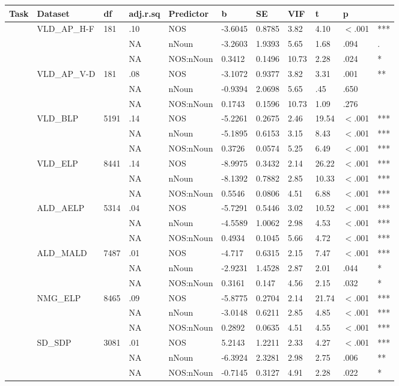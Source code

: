 \begin{table}[ht]
\centering
\begingroup\normalsize
\begin{tabular}{lllllllllll}
  \hline
Task & Dataset & df & adj.r.sq & Predictor & b & SE & VIF & t & p &  \\ 
  \hline
 & VLD\_AP\_H-F & 181 & .10 & NOS & -3.6045 & 0.8785 & 3.82 & 4.10 & $<$.001 & *** \\ 
   &  &  & NA & nNoun & -3.2603 & 1.9393 & 5.65 & 1.68 & .094 & . \\ 
   &  &  & NA & NOS:nNoun & 0.3412 & 0.1496 & 10.73 & 2.28 & .024 & * \\ 
   & VLD\_AP\_V-D & 181 & .08 & NOS & -3.1072 & 0.9377 & 3.82 & 3.31 & .001 & ** \\ 
   &  &  & NA & nNoun & -0.9394 & 2.0698 & 5.65 & .45 & .650 &   \\ 
   &  &  & NA & NOS:nNoun & 0.1743 & 0.1596 & 10.73 & 1.09 & .276 &   \\ 
   & VLD\_BLP & 5191 & .14 & NOS & -5.2261 & 0.2675 & 2.46 & 19.54 & $<$.001 & *** \\ 
   &  &  & NA & nNoun & -5.1895 & 0.6153 & 3.15 & 8.43 & $<$.001 & *** \\ 
   &  &  & NA & NOS:nNoun & 0.3726 & 0.0574 & 5.25 & 6.49 & $<$.001 & *** \\ 
   & VLD\_ELP & 8441 & .14 & NOS & -8.9975 & 0.3432 & 2.14 & 26.22 & $<$.001 & *** \\ 
   &  &  & NA & nNoun & -8.1392 & 0.7882 & 2.85 & 10.33 & $<$.001 & *** \\ 
   &  &  & NA & NOS:nNoun & 0.5546 & 0.0806 & 4.51 & 6.88 & $<$.001 & *** \\ 
   & ALD\_AELP & 5314 & .04 & NOS & -5.7291 & 0.5446 & 3.02 & 10.52 & $<$.001 & *** \\ 
   &  &  & NA & nNoun & -4.5589 & 1.0062 & 2.98 & 4.53 & $<$.001 & *** \\ 
   &  &  & NA & NOS:nNoun & 0.4934 & 0.1045 & 5.66 & 4.72 & $<$.001 & *** \\ 
   & ALD\_MALD & 7487 & .01 & NOS & -4.717 & 0.6315 & 2.15 & 7.47 & $<$.001 & *** \\ 
   &  &  & NA & nNoun & -2.9231 & 1.4528 & 2.87 & 2.01 & .044 & * \\ 
   &  &  & NA & NOS:nNoun & 0.3161 & 0.147 & 4.56 & 2.15 & .032 & * \\ 
   & NMG\_ELP & 8465 & .09 & NOS & -5.8775 & 0.2704 & 2.14 & 21.74 & $<$.001 & *** \\ 
   &  &  & NA & nNoun & -3.0148 & 0.6211 & 2.85 & 4.85 & $<$.001 & *** \\ 
   &  &  & NA & NOS:nNoun & 0.2892 & 0.0635 & 4.51 & 4.55 & $<$.001 & *** \\ 
   & SD\_SDP & 3081 & .01 & NOS & 5.2143 & 1.2211 & 2.33 & 4.27 & $<$.001 & *** \\ 
   &  &  & NA & nNoun & -6.3924 & 2.3281 & 2.98 & 2.75 & .006 & ** \\ 
   &  &  & NA & NOS:nNoun & -0.7145 & 0.3127 & 4.91 & 2.28 & .022 & * \\ 
   \hline
\end{tabular}
\endgroup
\end{table}
